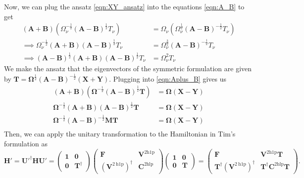 Now, we can plug the ansatz \ref{eqn:XY_ansatz} into the equations \ref{eqn:A_B} to get
\begin{equation}
\begin{split}
    \left(\textbf{A} + \textbf{B}\right) \left({\Omega }_\nu^{-\frac{1}{2}} \left(\textbf{A}-\textbf{B}\right)^{\frac{1}{2}}T_\nu\right) &= {\Omega }_\nu \left( {\Omega }_\nu^{\frac{1}{2}} \left(\textbf{A}-\textbf{B}\right)^{-\frac{1}{2}}T_\nu\right) \\
    \implies {\Omega }_\nu^{-\frac{1}{2}} \left(\textbf{A} + \textbf{B}\right) \left(\textbf{A}-\textbf{B}\right)^{\frac{1}{2}}T_\nu &= {\Omega }_\nu^{\frac{3}{2}} \left(\textbf{A}-\textbf{B}\right)^{-\frac{1}{2}}T_\nu \\
\implies \left(\textbf{A}-\textbf{B}\right)^{\frac{1}{2}} \left(\textbf{A} + \textbf{B}\right) \left(\textbf{A}-\textbf{B}\right)^{\frac{1}{2}}T_\nu &= {\Omega }_\nu^{2} T_\nu
\end{split}
\end{equation}
We make the ansatz that the eigenvectors of the symmetric formulation are given by $\textbf{T} = \boldsymbol{\Omega }^{\frac{1}{2}} \left(\textbf{A}-\textbf{B}\right)^{-\frac{1}{2}}\left(\textbf{X} + \textbf{Y}\right)$. Plugging into \ref{eqn:Aplus_B} gives us
\begin{align}
    \left(\textbf{A} + \textbf{B}\right) \left(\boldsymbol{\Omega }^{-\frac{1}{2}} \left(\textbf{A}-\textbf{B}\right)^{\frac{1}{2}}\bm{T}\right) &= \boldsymbol{\Omega } \left( \bm{X} - \bm{Y}\right) \\
\bm{\Omega}^{-\frac{1}{2}} \left(\textbf{A} + \textbf{B}\right) \left(\textbf{A}-\textbf{B}\right)^{\frac{1}{2}}\bm{T} &= \boldsymbol{\Omega } \left( \bm{X} - \bm{Y}\right) \\
\bm{\Omega}^{-\frac{1}{2}}\left(\textbf{A}-\textbf{B}\right)^{-\frac{1}{2}} \bm{M} \bm{T} &= \boldsymbol{\Omega } \left( \bm{X} - \bm{Y}\right) \\
\end{align}
Then, we can apply the unitary transformation to the Hamiltonian in Tim's formulation as
\begin{equation}
    \bm{H'} = \bm{U'}^\dag \bm{H} \bm{U'} = \begin{pmatrix} \bm{1} & \bm{0}\\ \bm{0}&\bm{T }^\dag \end{pmatrix} \begin{pmatrix} \bm{F} & \bm{V}^{2 \mathrm{h1p}}\\ \left(\bm{V}^{2 \mathrm{~h} 1 \mathrm{p}}\right)^{\dagger} & \bm{C}^{2 \mathrm{hlp}} \end{pmatrix} \begin{pmatrix} \bm{1} & \bm{0} \\ \bm{0}&\bm{T } \end{pmatrix} = \begin{pmatrix} \bm{F} & \bm{V}^{2 \mathrm{h1p}}\bm{T}\\ \bm{T}^\dag \left(\bm{V}^{2 \mathrm{~h} 1 \mathrm{p}}\right)^{\dagger} & \bm{T }^\dagger \bm{C}^{2 \mathrm{hlp}} \bm{T } \end{pmatrix}.
\label{eq:tim_upfolded_hamiltonian}
\end{equation}
